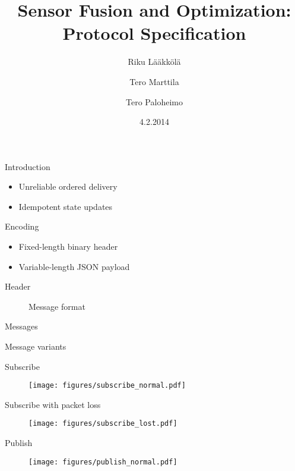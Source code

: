 \documentclass{beamer}
\title[SFO protocol]{Sensor Fusion and Optimization: Protocol Specification}
\author{Riku Lääkkölä \and Tero Marttila \and Tero Paloheimo}
\institute{Aalto ELEC}
\date{4.2.2014}
\begin{document}
\begin{frame}
  \titlepage
\end{frame}

\begin{frame}{Introduction}
\begin{itemize}
	\item Unreliable ordered delivery
    \item Idempotent state updates
\end{itemize}
\end{frame}

\begin{frame}{Encoding}
\begin{itemize}
	\item Fixed-length binary header
    \item Variable-length JSON payload
\end{itemize}
\end{frame}

\begin{frame}{Header}
\begin{figure}
	\centering
	{\scriptsize}
	\caption{Message format}
	\label{fig:header}
\end{figure}
\end{frame}

\begin{frame}{Messages}
\begin{table}
	\centering
	\caption{Message variants}
    {\scriptsize}
	\label{tbl:messages}
\end{table}
\end{frame}

\begin{frame}{Subscribe}
\begin{figure}
	\texttt{[image: figures/subscribe\_normal.pdf]}
\end{figure}
\end{frame}

\begin{frame}{Subscribe with packet loss}
\begin{figure}
	\texttt{[image: figures/subscribe\_lost.pdf]}
\end{figure}
\end{frame}

\begin{frame}{Publish}
\begin{figure}
	\texttt{[image: figures/publish\_normal.pdf]}
\end{figure}
\end{frame}
\end{document}
